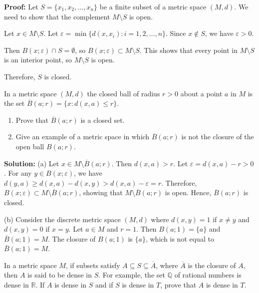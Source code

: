 \textbf{Proof:} Let $S = \{x_1, x_2, \ldots, x_n\}$ be a finite subset of a metric space $(M,d)$. We need to show that the complement $M \setminus S$ is open.

Let $x \in M \setminus S$. Let $\varepsilon = \min\{d(x,x_i) : i = 1,2,\ldots,n\}$. Since $x \notin S$, we have $\varepsilon > 0$.

Then $B(x;\varepsilon) \cap S = \emptyset$, so $B(x;\varepsilon) \subset M \setminus S$. This shows that every point in $M \setminus S$ is an interior point, so $M \setminus S$ is open.

Therefore, $S$ is closed.

\begin{problembox}
In a metric space \((M, d)\) the closed ball of radius \( r > 0 \) about a point \( a \) in \( M \) is the set \( \overline{B}(a; r) = \{x : d(x, a) \leq r\} \).
\begin{enumerate}[label=\alph*)]
\item Prove that \( \overline{B}(a; r) \) is a closed set.
\item Give an example of a metric space in which \( \overline{B}(a; r) \) is not the closure of the open ball \( B(a; r) \).
\end{enumerate}
\end{problembox}

\textbf{Solution:} 
(a) Let $x \in M \setminus \overline{B}(a;r)$. Then $d(x,a) > r$. Let $\varepsilon = d(x,a) - r > 0$. For any $y \in B(x;\varepsilon)$, we have $d(y,a) \geq d(x,a) - d(x,y) > d(x,a) - \varepsilon = r$. Therefore, $B(x;\varepsilon) \subset M \setminus \overline{B}(a;r)$, showing that $M \setminus \overline{B}(a;r)$ is open. Hence, $\overline{B}(a;r)$ is closed.

(b) Consider the discrete metric space $(M,d)$ where $d(x,y) = 1$ if $x \neq y$ and $d(x,y) = 0$ if $x = y$. Let $a \in M$ and $r = 1$. Then $B(a;1) = \{a\}$ and $\overline{B}(a;1) = M$. The closure of $B(a;1)$ is $\{a\}$, which is not equal to $\overline{B}(a;1) = M$.

\begin{problembox}
In a metric space \( M \), if subsets satisfy \( A \subseteq S \subseteq \overline{A} \), where \(\overline{A}\) is the closure of \( A \), then \( A \) is said to be dense in \( S \). For example, the set \( \mathbb{Q} \) of rational numbers is dense in \( \mathbb{R} \). If \( A \) is dense in \( S \) and if \( S \) is dense in \( T \), prove that \( A \) is dense in \( T \).
\end{problembox}

